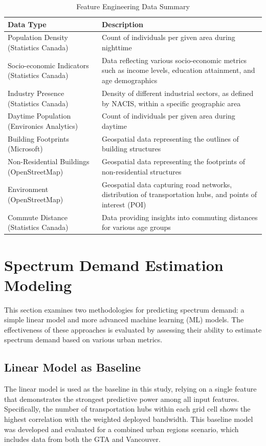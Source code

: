 \documentclass[conference]{IEEEtran}
\begin{document}
\begin{table}[h]
\centering
\caption{Feature Engineering Data Summary}
\label{tab:feature_engineering_data}
\begin{tabular}{@{}p{}p{}@{}}
\toprule
\textbf{Data Type} & \textbf{Description} \\
\midrule
Population Density (Statistics Canada) & Count of individuals per given area during nighttime\\
\midrule
Socio-economic Indicators (Statistics Canada) & Data reflecting various socio-economic metrics such as income levels, education attainment, and age demographics \\
\midrule
Industry Presence (Statistics Canada) & Density of different industrial sectors, as defined by NACIS, within a specific geographic area \\
\midrule
Daytime Population (Environics Analytics) & Count of individuals per given area during daytime \\
\midrule
Building Footprints (Microsoft) & Geospatial data representing the outlines of building structures \\
\midrule
Non-Residential Buildings (OpenStreetMap) & Geospatial data representing the footprints of non-residential structures \\
\midrule
Environment (OpenStreetMap) & Geospatial data capturing road networks, distribution of transportation hubs, and points of interest (POI)  \\
\midrule
Commute Distance (Statistics Canada) & Data providing insights into commuting distances for various age groups \\
\bottomrule
\end{tabular}
\end{table}






\section{Spectrum Demand Estimation Modeling}\label{Spectrum Demand Estimation Modeling}

This section examines two methodologies for predicting spectrum demand: a simple linear model and more advanced machine learning (ML) models. The effectiveness of these approaches is evaluated by assessing their ability to estimate spectrum demand based on various urban metrics.

\subsection{Linear Model as Baseline}
The linear model is used as the baseline in this study, relying on a single feature that demonstrates the strongest predictive power among all input features. Specifically, the number of transportation hubs within each grid cell shows the highest correlation with the weighted deployed bandwidth. This baseline model was developed and evaluated for a combined urban regions scenario, which includes data from both the GTA and Vancouver.
\end{document}
